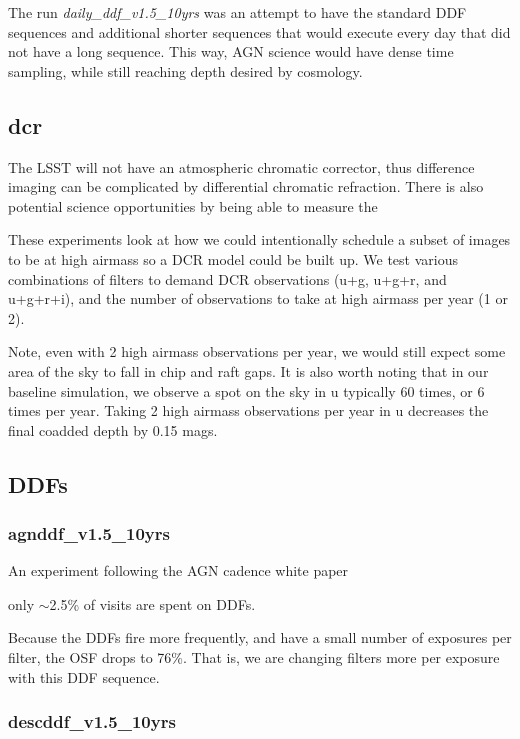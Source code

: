 The run \emph{daily\_ddf\_v1.5\_10yrs} was an attempt to have the standard DDF sequences and additional shorter sequences that would execute every day that did not have a long sequence.  This way, AGN science would have dense time sampling, while still reaching depth desired by cosmology.

\subsection{dcr}

The LSST will not have an atmospheric chromatic corrector, thus difference imaging can be complicated by differential chromatic refraction. There is also potential science opportunities by being able to measure the 

These experiments look at how we could intentionally schedule a subset of images to be at high airmass so a DCR model could be built up. We test various combinations of filters to demand DCR observations (u+g, u+g+r, and u+g+r+i), and the number of observations to take at high airmass per year (1 or 2). 

Note, even with 2 high airmass observations per year, we would still expect some area of the sky to fall in chip and raft gaps.  It is also worth noting that in our baseline simulation, we observe a spot on the sky in u typically 60 times, or 6 times per year. Taking 2 high airmass observations per year in u decreases the final coadded depth by 0.15 mags.

   
\subsection{DDFs}
\subsubsection{agnddf\_v1.5\_10yrs}

An experiment following the AGN cadence white paper

only $\sim$2.5\% of visits are spent on DDFs. 

Because the DDFs fire more frequently, and have a small number of exposures per filter, the OSF drops to 76\%. That is, we are changing filters more per exposure with this DDF sequence. 

\subsubsection{descddf\_v1.5\_10yrs}

